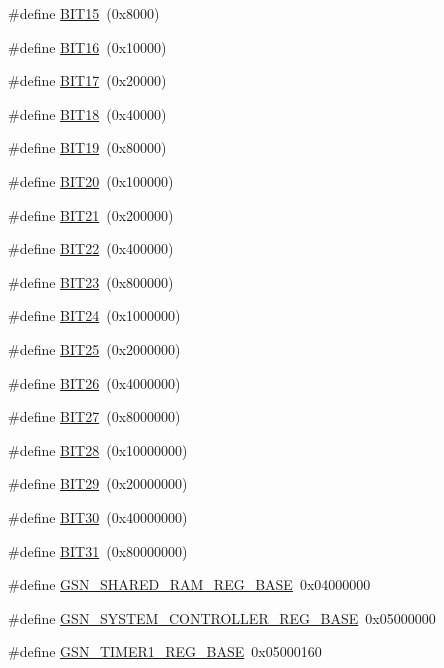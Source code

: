 \begin{DoxyCompactItemize}
\item 
\#define \hyperlink{a00546_ae40f5db1c57c98c6db42f15e0a56f03a}{BIT15}~(0x8000)
\item 
\#define \hyperlink{a00546_a7c55b9d74a6a1b129397792053cf08d5}{BIT16}~(0x10000)
\item 
\#define \hyperlink{a00546_a27fe52b845a36280f50414ab4a00f74f}{BIT17}~(0x20000)
\item 
\#define \hyperlink{a00546_a56a026d146963b7d977255d9b1f682ae}{BIT18}~(0x40000)
\item 
\#define \hyperlink{a00546_a9ce58ae33c478370e59c915b04b05381}{BIT19}~(0x80000)
\item 
\#define \hyperlink{a00546_a83aaba3456aa46dfefe199fe6264d8dc}{BIT20}~(0x100000)
\item 
\#define \hyperlink{a00546_a1a5b4d4ca137f11bcb2e9c381f2ea6c5}{BIT21}~(0x200000)
\item 
\#define \hyperlink{a00546_afdaa01ee37bdcd01ea44dbab6a30fd0d}{BIT22}~(0x400000)
\item 
\#define \hyperlink{a00546_ada7be80971d1875e5c4774edd3ecd97d}{BIT23}~(0x800000)
\item 
\#define \hyperlink{a00546_a96cfb019bda32752ff4c8b8244aa6ea0}{BIT24}~(0x1000000)
\item 
\#define \hyperlink{a00546_a3017291241a7269c1582154a3d3b1f09}{BIT25}~(0x2000000)
\item 
\#define \hyperlink{a00546_a4f97a8963cc15a1a50521d855b8a1331}{BIT26}~(0x4000000)
\item 
\#define \hyperlink{a00546_afdd1584eaddf508717554b35a600b0fd}{BIT27}~(0x8000000)
\item 
\#define \hyperlink{a00546_a4361544977e96fb8eb8387ff0feaf6b6}{BIT28}~(0x10000000)
\item 
\#define \hyperlink{a00546_adb368e517e545da53d8aace5923649e1}{BIT29}~(0x20000000)
\item 
\#define \hyperlink{a00546_a70105c4a8c864754c8ba9e9b0e5da52a}{BIT30}~(0x40000000)
\item 
\#define \hyperlink{a00546_adfb09898dca36071e32cb1fbeec479e5}{BIT31}~(0x80000000)
\item 
\#define \hyperlink{a00546_a0b8b89d6ae1608f121741f46bd36c3b4}{GSN\_\-SHARED\_\-RAM\_\-REG\_\-BASE}~0x04000000
\item 
\#define \hyperlink{a00546_a70419b9b8bf893fe3875d36d494a5674}{GSN\_\-SYSTEM\_\-CONTROLLER\_\-REG\_\-BASE}~0x05000000
\item 
\#define \hyperlink{a00546_ade0504ec26a001bab0d330bcff353edd}{GSN\_\-TIMER1\_\-REG\_\-BASE}~0x05000160

\end{DoxyCompactItemize}
